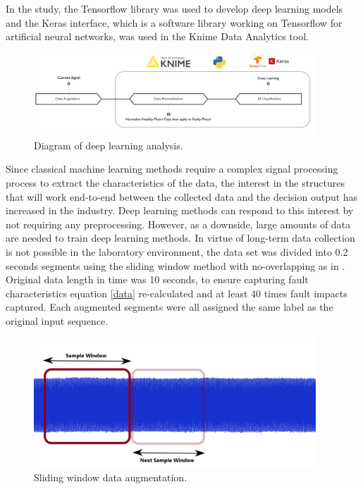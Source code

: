 In the study, the Tensorflow library was used to develop deep learning models and the Keras interface, which is a software library working on Tensorflow for artificial neural networks, was used in the Knime Data Analytics tool.

\begin{figure}[h]
	\centering
	\includegraphics[width=300pt,keepaspectratio=true]{./fig/method4.PNG}
	\caption{Diagram of deep learning analysis.}	
	\label{method4}
\end{figure}

Since classical machine learning methods require a complex signal processing process to extract the characteristics of the data, the interest in the structures that will work end-to-end between the collected data and the decision output has increased in the industry. Deep learning methods can respond to this interest by not requiring any preprocessing. However, as a downside, large amounts of data are needed to train deep learning methods. In virtue of long-term data collection is not possible in the laboratory environment, the data set was divided into 0.2 seconds segments using the sliding window method with no-overlapping as in \cite{shenfield2020novel}. Original data length in time was 10 seconds, to ensure capturing fault characteristics equation \ref{data} re-calculated and at least 40 times fault impacts captured. Each augmented segments were all assigned the same label as the original input sequence.

\begin{figure}[h]
	\centering
	\includegraphics[width=300pt,keepaspectratio=true]{./fig/data.png}
	\caption{Sliding window data augmentation.}	
	\label{dataslide}
\end{figure}

